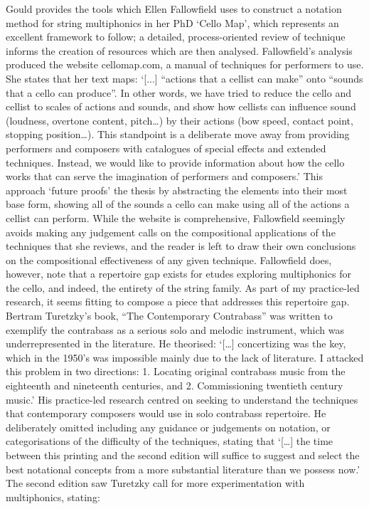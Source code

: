 Gould provides the tools which Ellen Fallowfield uses to construct a notation method for string multiphonics in her PhD ‘Cello Map’, which represents an excellent framework to follow; a detailed, process-oriented review of technique informs the creation of resources which are then analysed.  Fallowfield’s analysis produced the website cellomap.com, a manual of techniques for performers to use. She states that her text maps:
‘[...] “actions that a cellist can make” onto “sounds that a cello can produce”. In other words, we have tried to reduce the cello and cellist to scales of actions and sounds, and show how cellists can influence sound (loudness, overtone content, pitch…) by their actions (bow speed, contact point, stopping position…). This standpoint is a deliberate move away from providing performers and composers with catalogues of special effects and extended techniques. Instead, we would like to provide information about how the cello works that can serve the imagination of performers and composers.’ 
This approach ‘future proofs’ the thesis by abstracting the elements into their most base form, showing all of the sounds a cello can make using all of the actions a cellist can perform. While the website is comprehensive, Fallowfield seemingly avoids making any judgement calls on the compositional applications of the techniques that she reviews, and the reader is left to draw their own conclusions on the compositional effectiveness of any given technique. Fallowfield does, however, note that a repertoire gap exists for etudes exploring multiphonics for the cello, and indeed, the entirety of the string family. As part of my practice-led research, it seems fitting to compose a piece that addresses this repertoire gap. 
Bertram Turetzky’s book, “The Contemporary Contrabass” was written to exemplify the contrabass as a serious solo and melodic instrument, which was underrepresented in the literature. He theorised: 
‘[…] concertizing was the key, which in the 1950’s was impossible mainly due to the lack of literature. I attacked this problem in two directions: 1. Locating original contrabass music from the eighteenth and nineteenth centuries, and 2. Commissioning twentieth century music.’  
His practice-led research centred on seeking to understand the techniques that contemporary composers would use in solo contrabass repertoire. He deliberately omitted including any guidance or judgements on notation, or categorisations of the difficulty of the techniques, stating that ‘[…] the time between this printing and the second edition will suffice to suggest and select the best notational concepts from a more substantial literature than we possess now.’  The second edition saw Turetzky call for more experimentation with multiphonics, stating:
